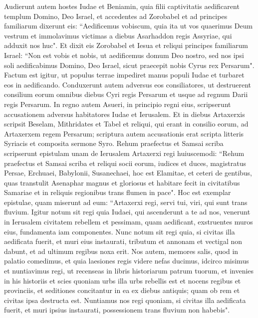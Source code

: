 \begin{biblechapter}  
\verse Audierunt autem hostes Iudae et Beniamin, quia filii captivitatis aedificarent templum Domino, Deo Israel, 
\verse et accedentes ad Zorobabel et ad principes familiarum dixerunt eis: “Aedificemus vobiscum, quia ita ut vos quaerimus Deum vestrum et immolavimus victimas a diebus Asarhaddon regis Assyriae, qui adduxit nos huc". 
\verse Et dixit eis Zorobabel et Iesua et reliqui principes familiarum Israel: “Non est vobis et nobis, ut aedificemus domum Deo nostro, sed nos ipsi soli aedificabimus Domino, Deo Israel, sicut praecepit nobis Cyrus rex Persarum". 
\verse Factum est igitur, ut populus terrae impediret manus populi Iudae et turbaret eos in aedificando. 
\verse Conduxerunt autem adversus eos consiliatores, ut destruerent consilium eorum omnibus diebus Cyri regis Persarum et usque ad regnum Darii regis Persarum. 
\verse In regno autem Asueri, in principio regni eius, scripserunt accusationem adversus habitatores Iudae et Ierusalem. 
\verse Et in diebus Artaxerxis scripsit Beselam, Mithridates et Tabel et reliqui, qui erant in consilio eorum, ad Artaxerxem regem Persarum; scriptura autem accusationis erat scripta litteris Syriacis et composita sermone Syro. 
\verse Rehum praefectus et Samsai scriba scripserunt epistulam unam de Ierusalem Artaxerxi regi huiuscemodi: 
\verse “Rehum praefectus et Samsai scriba et reliqui socii eorum, iudices et duces, magistratus Persae, Erchuaei, Babylonii, Susanechaei, hoc est Elamitae, 
\verse et ceteri de gentibus, quas transtulit Asenaphar magnus et gloriosus et habitare fecit in civitatibus Samariae et in reliquis regionibus trans flumen in pace". 
\verse Hoc est exemplar epistulae, quam miserunt ad eum: “Artaxerxi regi, servi tui, viri, qui sunt trans fluvium. Igitur 
\verse notum sit regi quia Iudaei, qui ascenderunt a te ad nos, venerunt in Ierusalem civitatem rebellem et pessimam, quam aedificant, exstruentes muros eius, fundamenta iam componentes. 
\verse Nunc notum sit regi quia, si civitas illa aedificata fuerit, et muri eius instaurati, tributum et annonam et vectigal non dabunt, et ad ultimum regibus noxa erit. 
\verse Nos autem, memores salis, quod in palatio comedimus, et quia laesiones regis videre nefas ducimus, idcirco misimus et nuntiavimus regi, 
\verse ut recenseas in libris historiarum patrum tuorum, et invenies in his historiis et scies quoniam urbs illa urbs rebellis est et nocens regibus et provinciis, et seditiones concitantur in ea ex diebus antiquis; quam ob rem et civitas ipsa destructa est. 
\verse Nuntiamus nos regi quoniam, si civitas illa aedificata fuerit, et muri ipsius instaurati, possessionem trans fluvium non habebis". 

\end{biblechapter}

